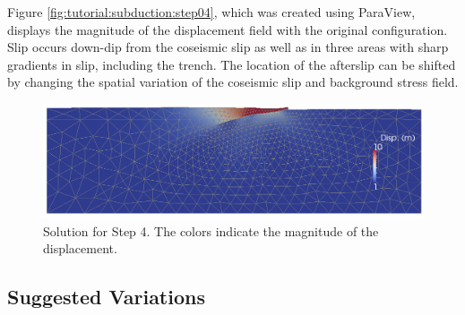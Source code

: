 Figure \vref{fig:tutorial:subduction:step04}, which was created using
ParaView, displays the magnitude of the displacement field with the
original configuration. Slip occurs down-dip from the coseismic slip
as well as in three areas with sharp gradients in slip, including
the trench. The location of the afterslip can be shifted by changing
the spatial variation of the coseismic slip and background stress
field.

\noindent \begin{center}
\begin{figure}
\begin{centering}
\includegraphics[width=4.5in]{tutorials/subduction/figs/step01_soln}
\par\end{centering}

\caption{Solution for Step 4. The colors indicate the magnitude of the displacement.
\label{fig:tutorial:subduction:step04}}
\end{figure}

\par\end{center}


\subsection{Suggested Variations}

